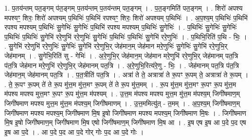 \documentclass[17pt]{extarticle}
\begin{document}
1. प॒तय॑न्तम् पत॒ङ्गम् प॑त॒ङ्गम् प॒तय॑न्तम् प॒तय॑न्तम् पत॒ङ्गम् । . प॒त॒ङ्गमिति॑ पत॒ङ्गम् । . शिरो॑ अपश्य मपश्यꣳ॒॒ शिरः॒ शिरो॑ अपश्यम् प॒थिभिः॑ प॒थिभि॑ रपश्यꣳ॒॒ शिरः॒ शिरो॑ अपश्यम् प॒थिभिः॑ । . अ॒प॒श्य॒म् प॒थिभिः॑ प॒थिभि॑ रपश्य मपश्यम् प॒थिभिः॑ सु॒गेभिः॑ सु॒गेभिः॑ प॒थिभि॑ रपश्य मपश्यम् प॒थिभिः॑ सु॒गेभिः॑ । . प॒थिभिः॑ सु॒गेभिः॑ सु॒गेभिः॑ प॒थिभिः॑ प॒थिभिः॑ सु॒गेभि॑ ररे॒णुभि॑ ररे॒णुभिः॑ सु॒गेभिः॑ प॒थिभिः॑ प॒थिभिः॑ सु॒गेभि॑ ररे॒णुभिः॑ । . प॒थिभि॒रिति॑ प॒थि - भिः॒ । . सु॒गेभि॑ ररे॒णुभि॑ ररे॒णुभिः॑ सु॒गेभिः॑ सु॒गेभि॑ ररे॒णुभि॒र् जेह॑मान॒म् जेह॑मान मरे॒णुभिः॑ सु॒गेभिः॑ सु॒गेभि॑ ररे॒णुभि॒र् जेह॑मानम् । . सु॒गेभि॒रिति॑ सु - गेभिः॑ । . अ॒रे॒णुभि॒र् जेह॑मान॒म् जेह॑मान मरे॒णुभि॑ ररे॒णुभि॒र् जेह॑मानम् पत॒त्रि प॑त॒त्रि जेह॑मान मरे॒णुभि॑ ररे॒णुभि॒र् जेह॑मानम् पत॒त्रि । . अ॒रे॒णुभि॒रित्य॑रे॒णु - भिः॒ । . जेह॑मानम् पत॒त्रि प॑त॒त्रि जेह॑मान॒म् जेह॑मानम् पत॒त्रि । . प॒त॒त्रीति॑ पत॒त्रि । . अत्रा॑ ते ते॒ अत्रात्रा॑ ते रू॒पꣳ रू॒पम् ते॒ अत्रात्रा॑ ते रू॒पम् । . ते॒ रू॒पꣳ रू॒पम् ते॑ ते रू॒प मु॑त्त॒म मु॑त्त॒मꣳ रू॒पम् ते॑ ते रू॒प मु॑त्त॒मम् । . रू॒प मु॑त्त॒म मु॑त्त॒मꣳ रू॒पꣳ रू॒प मु॑त्त॒म म॑पश्य मपश्य मुत्त॒मꣳ रू॒पꣳ रू॒प मु॑त्त॒म म॑पश्यम् । . उ॒त्त॒म म॑पश्य मपश्य मुत्त॒म मु॑त्त॒म म॑पश्य॒म् जिगी॑षमाण॒म् जिगी॑षमाण मपश्य मुत्त॒म मु॑त्त॒म म॑पश्य॒म् जिगी॑षमाणम् । . उ॒त्त॒ममित्यु॑त् - त॒मम् । . अ॒प॒श्य॒म् जिगी॑षमाण॒म् जिगी॑षमाण मपश्य मपश्य॒म् जिगी॑षमाण मि॒ष इ॒षो जिगी॑षमाण मपश्य मपश्य॒म् जिगी॑षमाण मि॒षः । . जिगी॑षमाण मि॒ष इ॒षो जिगी॑षमाण॒म् जिगी॑षमाण मि॒ष एषो जिगी॑षमाण॒म् जिगी॑षमाण मि॒ष आ । . इ॒ष एष इ॒ष आ प॒दे प॒द एष इ॒ष आ प॒दे । . आ प॒दे प॒द आ प॒दे गोर् गोः प॒द आ प॒दे गोः । \newline
\end{document}
